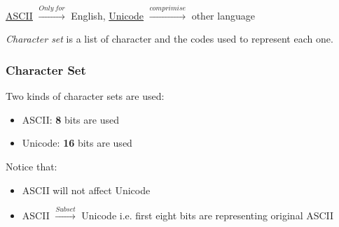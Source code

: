 \documentclass[12pt]{article}
\begin{document}
\underline{ASCII} $\xrightarrow{Only\ for}$ English, \underline{Unicode} $\xrightarrow{comprimise}$ other language

\emph{Character set} is a list of character and the codes used to represent each one.

\subsubsection{Character Set}
Two kinds of character sets are used:
\begin{itemize}
    \item ASCII: \textbf{8} bits are used
    \item Unicode: \textbf{16} bits are used 
\end{itemize}
Notice that:
\begin{itemize}
    \item ASCII will not affect Unicode
    \item ASCII $\xrightarrow{Subset}$ Unicode \newline
    i.e. first eight bits are representing original ASCII
\end{itemize}
\end{document}
